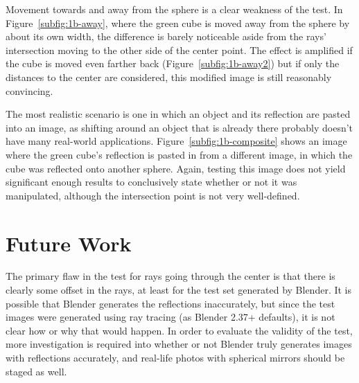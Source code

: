 \documentclass{thesis}
\begin{document}
Movement towards and away from the sphere is a clear weakness of the test. In Figure~\ref{subfig:1b-away}, where the green cube is moved away from the sphere by about its own width, the difference is barely noticeable aside from the rays' intersection moving to the other side of the center point. The effect is amplified if the cube is moved even farther back (Figure~\ref{subfig:1b-away2}) but if only the distances to the center are considered, this modified image is still reasonably convincing.

The most realistic scenario is one in which an object and its reflection are pasted into an image, as shifting around an object that is already there probably doesn't have many real-world applications. Figure~\ref{subfig:1b-composite} shows an image where the green cube's reflection is pasted in from a different image, in which the cube was reflected onto another sphere. Again, testing this image does not yield significant enough results to conclusively state whether or not it was manipulated, although the intersection point is not very well-defined.

\chapter{Future Work}
The primary flaw in the test for rays going through the center is that there is clearly some offset in the rays, at least for the test set generated by Blender. It is possible that Blender generates the reflections inaccurately, but since the test images were generated using ray tracing (as Blender 2.37+ defaults), it is not clear how or why that would happen. In order to evaluate the validity of the test, more investigation is required into whether or not Blender truly generates images with reflections accurately, and real-life photos with spherical mirrors should be staged as well.



\clearpage

%


\end{document}
